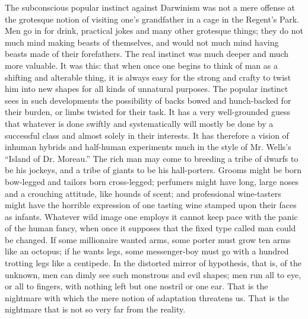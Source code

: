 \documentclass{book}
\begin{document}
The subconscious popular instinct against Darwinism was not a mere offense at the grotesque notion of visiting one’s grandfather in a cage in the Regent’s Park. Men go in for drink, practical jokes and many other grotesque things; they do not much mind making beasts of themselves, and would not much mind having beasts made of their forefathers. The real instinct was much deeper and much more valuable. It was this: that when once one begins to think of man as a shifting and alterable thing, it is always easy for the strong and crafty to twist him into new shapes for all kinds of unnatural purposes. The popular instinct sees in such developments the possibility of backs bowed and hunch-backed for their burden, or limbs twisted for their task. It has a very well-grounded guess that whatever is done swiftly and systematically will mostly be done by a successful class and almost solely in their interests. It has therefore a vision of inhuman hybrids and half-human experiments much in the style of Mr. Wells’s “Island of Dr. Moreau.” The rich man may come to breeding a tribe of dwarfs to be his jockeys, and a tribe of giants to be his hall-porters. Grooms might be born bow-legged and tailors born cross-legged; perfumers might have long, large noses and a crouching attitude, like hounds of scent; and professional wine-tasters might have the horrible expression of one tasting wine stamped upon their faces as infants. Whatever wild image one employs it cannot keep pace with the panic of the human fancy, when once it supposes that the fixed type called man could be changed. If some millionaire wanted arms, some porter must grow ten arms like an octopus; if he wants legs, some messenger-boy must go with a hundred trotting legs like a centipede. In the distorted mirror of hypothesis, that is, of the unknown, men can dimly see such monstrous and evil shapes; men run all to eye, or all to fingers, with nothing left but one nostril or one ear. That is the nightmare with which the mere notion of adaptation threatens us. That is the nightmare that is not so very far from the reality.
\end{document}

